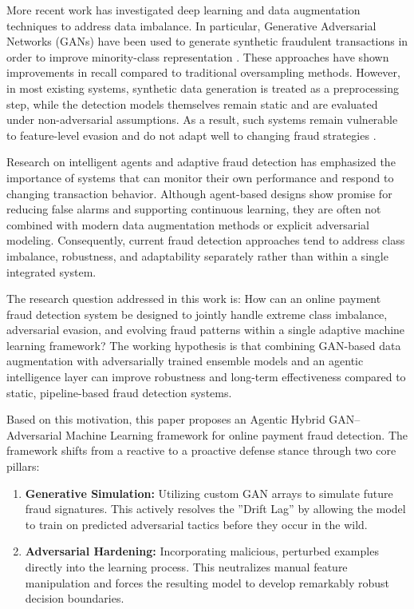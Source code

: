 \documentclass[conference]{IEEEtran}
\begin{document}
More recent work has investigated deep learning and data augmentation techniques to address data imbalance. In particular, Generative Adversarial Networks (GANs) have been used to generate synthetic fraudulent transactions in order to improve minority-class representation \cite{goodfellow2014generative, strelcenia2023survey}. These approaches have shown improvements in recall compared to traditional oversampling methods. However, in most existing systems, synthetic data generation is treated as a preprocessing step, while the detection models themselves remain static and are evaluated under non-adversarial assumptions. As a result, such systems remain vulnerable to feature-level evasion and do not adapt well to changing fraud strategies \cite{biggio2013evasion, szegedy2013intriguing}.

Research on intelligent agents and adaptive fraud detection has emphasized the importance of systems that can monitor their own performance and respond to changing transaction behavior. Although agent-based designs show promise for reducing false alarms and supporting continuous learning, they are often not combined with modern data augmentation methods or explicit adversarial modeling. Consequently, current fraud detection approaches tend to address class imbalance, robustness, and adaptability separately rather than within a single integrated system.

The research question addressed in this work is: How can an online payment fraud detection system be designed to jointly handle extreme class imbalance, adversarial evasion, and evolving fraud patterns within a single adaptive machine learning framework? The working hypothesis is that combining GAN-based data augmentation with adversarially trained ensemble models and an agentic intelligence layer can improve robustness and long-term effectiveness compared to static, pipeline-based fraud detection systems.

Based on this motivation, this paper proposes an Agentic Hybrid GAN–Adversarial Machine Learning framework for online payment fraud detection. The framework shifts from a reactive to a proactive defense stance through two core pillars:
\begin{enumerate}
    \item \textbf{Generative Simulation:} Utilizing custom GAN arrays to simulate future fraud signatures. This actively resolves the ''Drift Lag'' by allowing the model to train on predicted adversarial tactics before they occur in the wild.
    \item \textbf{Adversarial Hardening:} Incorporating malicious, perturbed examples directly into the learning process. This neutralizes manual feature manipulation and forces the resulting model to develop remarkably robust decision boundaries.
\end{enumerate}
\end{document}

